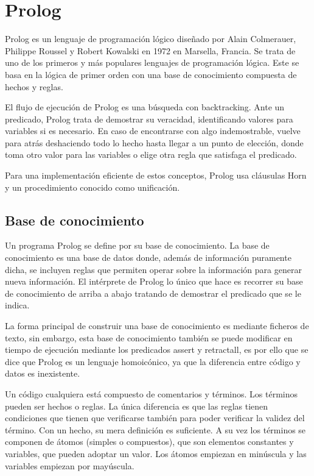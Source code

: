 \documentclass[openright,twoside,12pt]{book}
\begin{document}
\section{Prolog}

Prolog\cite{prolog} es un lenguaje de programación lógico diseñado por Alain Colmerauer, Philippe Roussel y Robert Kowalski en 1972 en Marsella, Francia. Se trata de uno de los primeros y más populares lenguajes de programación lógica. Este se basa en la lógica de primer orden con una base de conocimiento compuesta de hechos y reglas. 

El flujo de ejecución de Prolog es una búsqueda con backtracking. Ante un predicado, Prolog trata de demostrar su veracidad, identificando valores para variables si es necesario. En caso de encontrarse con algo indemostrable, vuelve para atrás deshaciendo todo lo hecho hasta llegar a un punto de elección, donde toma otro valor para las variables o elige otra regla que satisfaga el predicado.

Para una implementación eficiente de estos conceptos, Prolog usa cláusulas Horn y un procedimiento conocido como unificación.

\subsection{Base de conocimiento}

Un programa Prolog se define por su base de conocimiento. La base de conocimiento es una base de datos donde, además de información puramente dicha, se incluyen reglas que permiten operar sobre la información para generar nueva información. El intérprete de Prolog lo único que hace es recorrer su base de conocimiento de arriba a abajo tratando de demostrar el predicado que se le indica.

La forma principal de construir una base de conocimiento es mediante ficheros de texto, sin embargo, esta base de conocimiento también se puede modificar en tiempo de ejecución mediante los predicados assert y retractall, es por ello que se dice que Prolog es un lenguaje homoicónico, ya que la diferencia entre código y datos es inexistente.

Un código cualquiera está compuesto de comentarios y términos. Los términos pueden ser hechos o reglas. La única diferencia es que las reglas tienen condiciones que tienen que verificarse también para poder verificar la validez del término. Con un hecho, su mera definición es suficiente. A su vez los términos se componen de átomos (simples o compuestos), que son elementos constantes y variables, que pueden adoptar un valor. Los átomos empiezan en minúscula y las variables empiezan por mayúscula.
\end{document}
